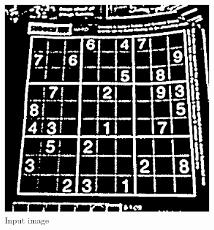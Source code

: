 \begin{figure}[]

    \begin{subfigure}{0.3\textwidth}
        \includegraphics[width=\linewidth] {../../test/threshold/1.jpg}
        \caption{Input image}\label{fig:sht_example:a}
    \end{subfigure}\hfill
    \begin{subfigure}{0.3\textwidth}

\end{subfigure}
\end{figure}
